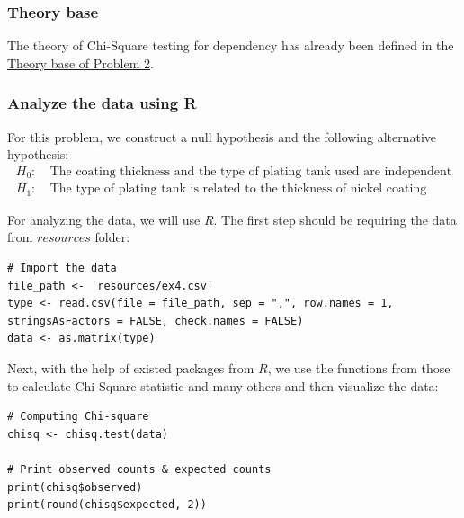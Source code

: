 \documentclass[a4paper]{article}
\numberwithin{equation}{section}
\begin{document}
\subsubsection{Theory base}
The theory of Chi-Square testing for dependency has already been defined in the \hyperref[p2:theory]{\underline{Theory base of Problem 2}}.

\subsubsection{Analyze the data using R}
For this problem, we construct a null hypothesis and the following alternative hypothesis:
\begin{align*}
  H_0: & \ \text{The coating thickness and the type of plating tank used are independent} \\
  H_1: & \ \text{The type of plating tank is related to the thickness of nickel coating}
\end{align*}

For analyzing the data, we will use \(R\). The first step should be requiring the data from \(resources\) folder:
\begin{mdframed}[leftline=false,rightline=false,backgroundcolor=magenta!10,nobreak=true]
  \begin{verbatim}
# Import the data
file_path <- 'resources/ex4.csv'
type <- read.csv(file = file_path, sep = ",", row.names = 1, stringsAsFactors = FALSE, check.names = FALSE)
data <- as.matrix(type)
  \end{verbatim}
\end{mdframed}

Next, with the help of existed packages from \(R\), we use the functions from those to calculate Chi-Square statistic and many others and then visualize the data:
\begin{mdframed}[leftline=false,rightline=false,backgroundcolor=magenta!10,nobreak=true]
  \begin{verbatim}
# Computing Chi-square
chisq <- chisq.test(data)

# Print observed counts & expected counts
print(chisq$observed)
print(round(chisq$expected, 2))
  \end{verbatim}
\end{mdframed}
\end{document}
